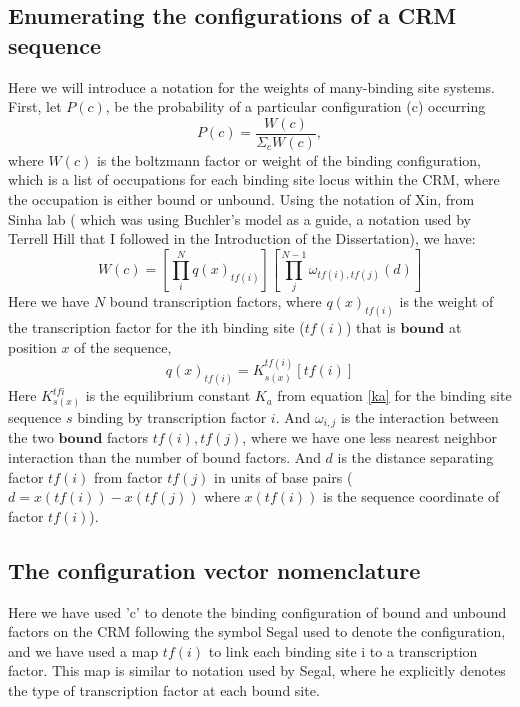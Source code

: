\subsection{ Enumerating the configurations of a CRM sequence }

 Here we will introduce a notation for the weights of many-binding site systems.  First, let $P(c)$, be the probability of a particular configuration (c) occurring
\begin{equation}\label{mbody}
    P(c) = \frac{W(c)}{\Sigma_c W(c)},
\end{equation}
where $ W(c)$ is the boltzmann factor or weight of the binding configuration, which is a list of occupations for each binding site locus within the CRM, where the occupation is either bound or unbound.   Using the notation of Xin, from Sinha lab ( which was using Buchler's model as a guide\cite{pmid20862354}\cite{pmid12702751}, a notation used by Terrell Hill that I followed in the Introduction of the Dissertation), we have:
\begin{equation}\label{wc}
    W(c)=  [\prod_i^N q(x)_{tf(i)} ] [\prod_{j}^{N-1} \omega_{tf(i),tf(j)}(d)]
\end{equation}
Here we have $N$ bound transcription factors, where $q(x)_{tf(i)}$ is the weight of the transcription factor for the ith binding site ($tf(i)$) that is $\textbf{bound}$ at position $x$ of the sequence, 
\begin{equation}\label{partitionf}
    q(x)_{tf(i)} = K_{s(x)}^{tf(i)} [tf(i)]
\end{equation}
Here $ K_{s(x)}^{tf{i}}$ is the equilibrium constant $K_a$ from equation \eqref{ka} for the binding site sequence $s$ binding by transcription factor $i$.  And $\omega_{i,j}$ is the interaction between the two $\textbf{bound}$ factors $tf(i),tf(j)$, where we have one less nearest neighbor interaction than the number of bound factors.  And $d$ is the distance separating factor $tf(i)$ from factor $tf(j)$ in units of base pairs ( $d = x(tf(i)) - x(tf(j))$ where $x(tf(i))$ is the sequence coordinate of factor $tf(i)$).
\subsection{The configuration vector nomenclature}

 Here we have used 'c' to denote the binding configuration of bound and unbound factors on the CRM following the symbol Segal used to denote the configuration, and we have used a map $tf(i)$ to link each binding site i to a transcription factor.  This map is similar to notation used by Segal, where he explicitly denotes the type of transcription factor at each bound site.
 
